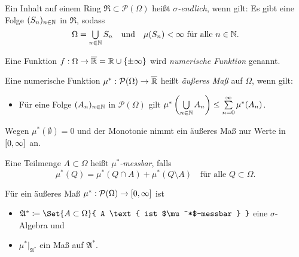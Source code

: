 \documentclass{cheat-sheet}
\newcommand{\PS}{\mathcal{P}} %
\newcommand{\PSO}{\PS(\Omega)} %
\newcommand{\Alg}{\mathfrak{A}} %
\newcommand{\Ring}{\mathfrak{R}} %
\theoremstyle{definition}
\begin{document}

\begin{defn}
  Ein Inhalt auf einem Ring $\Ring \subset \PSO$ heißt \emph{$\sigma$-endlich}, wenn gilt: Es gibt eine Folge $(S_n)_{n \in \mathbb{N}}$ in $\Ring$, sodass
  \[
      \Omega = \bigcup_{n \in \N} S_n
      \quad \text{und} \quad
      \mu(S_n) < \infty \text{ für alle } n \in \N.
  \]
\end{defn}

\begin{defn}
  Eine Funktion $f : \Omega \to \overline{\mathbb{R}} = \mathbb{R} \cup \{ \pm \infty \}$ wird \emph{numerische Funktion} genannt.
\end{defn}

\begin{defn}
  Eine numerische Funktion $\mu^* : \PSO \to \overline{\R}$ heißt \emph{äußeres Maß} auf $\Omega$, wenn gilt:
  \begin{itemize}
    \item Für eine Folge $(A_n)_{n \in \mathbb{N}}$ in $\mathcal{P}(\Omega)$ gilt $\mu^*\left(\bigcup_{n \in \N} A_n \right) \leq \sum_{n = 0}^\infty \mu^*(A_n)$. %
  \end{itemize}
\end{defn}

\begin{bem}
  Wegen $\mu^*(\emptyset) = 0$ und der Monotonie nimmt ein äußeres Maß nur Werte in $\left[ 0, \infty \right]$ an.
\end{bem}

\begin{defn}
  Eine Teilmenge $A \subset \Omega$ heißt \emph{$\mu^*$-messbar}, falls
  \[ \mu^*(Q) = \mu^*(Q \cap A) + \mu^*(Q \setminus A) \quad \text{für alle } Q \subset \Omega. \]
\end{defn}

\begin{satz}[Carathéodory]
  Für ein äußeres Maß $\mu^* : \PSO \to \cinterval{0}{\infty}$ ist
  \begin{itemize}
    \item $\Alg^* \coloneqq \Set{ A \subset \Omega }{ A \text{ ist $\mu^*$-messbar } }$ eine $\sigma$-Algebra und
    \item $\mu^*|_{\Alg^*}$ ein Maß auf $\Alg^*$.
  \end{itemize}
\end{satz}
\end{document}
